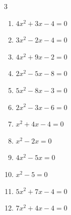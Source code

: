 \begin{multicols}{3}
\begin{enumerate}
\columnbreak %

  \item $4x^{2}+3x-4=0$


  \item $3x^{2}-2x-4=0$


  \item $4x^{2}+9x-2=0$


  \item $2x^{2}-5x-8=0$


  \item $5x^{2}-8x-3=0$


  \item $2x^{2}-3x-6=0$


  \item $x^{2}+4x-4=0$


\columnbreak %

\resetques

  \item $x^{2}-2x=0$

        \phantom{$\displaystyle x=2, \; 0$}

  \item $4x^{2}-5x=0$


  \item $x^{2}-5=0$


  \item $5x^{2}+7x-4=0$


  \item $7x^{2}+4x-4=0$



\end{enumerate}
\end{multicols}
